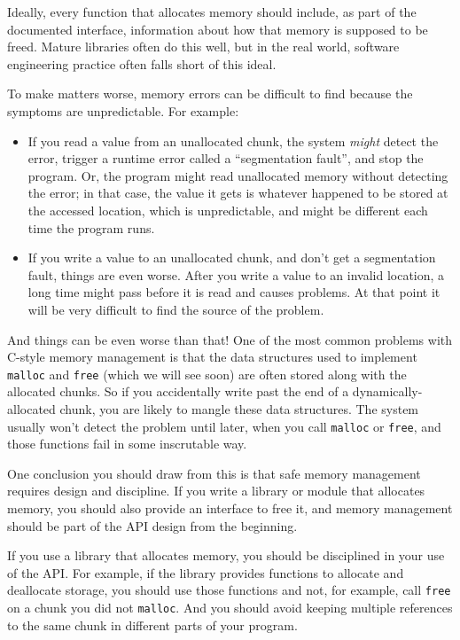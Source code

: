 \documentclass[12pt]{book}
\begin{document}
Ideally, every function that allocates memory should include, as part
of the documented interface, information about how that memory is supposed
to be freed.  Mature libraries often do this well, but in the real world,
software engineering practice often falls short of this ideal.

To make matters worse, memory errors can be difficult
to find because the symptoms are unpredictable.  For example:

\begin{itemize}

\item If you read a value from an unallocated chunk, the system {\em might} detect the error, trigger a runtime error called a ``segmentation fault'', and stop the program.  Or, the program might read unallocated memory without detecting the error; in that case, the value it gets is whatever happened to be stored at the accessed location, which is unpredictable, and might be different each time the program runs.

\item If you write a value to an unallocated chunk, and don't get a segmentation fault, things are even worse.  After you write a value to an invalid location, a long time might pass before it is read and causes problems.  At that point it will be very difficult to find the source of the problem.

\end{itemize} 

And things can be even worse than that!  One of the most common
problems with C-style memory management is that the data structures
used to implement {\tt malloc} and {\tt free} (which we will see soon)
are often stored along with the allocated chunks.  So if you
accidentally write past the end of a dynamically-allocated chunk, you
are likely to mangle these data structures.  The system usually won't
detect the problem until later, when you call {\tt malloc} or
{\tt free}, and those functions fail in some inscrutable way.

One conclusion you should draw from this is that safe memory
management requires design and discipline.  If you write a library
or module that allocates memory, you should also provide an
interface to free it, and memory management should be part of
the API design from the beginning.

If you use a library that allocates memory, you should be disciplined
in your use of the API.  For example, if the library provides
functions to allocate and deallocate storage, you should use those
functions and not, for example, call {\tt free} on a chunk you did not
{\tt malloc}.  And you should avoid keeping multiple references to the
same chunk in different parts of your program.
\end{document}

